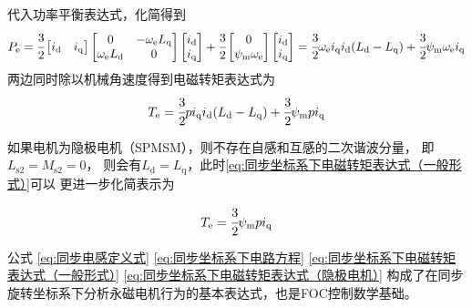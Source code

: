 代入功率平衡表达式，化简得到
\begin{equation*}
P_{\mathrm{e}}=\cfrac32\begin{bmatrix}i_{\mathrm{d}}&i_{\mathrm{q}}\end{bmatrix}
\begin{bmatrix}0&-\omega_{\mathrm{e}}L_{\mathrm{q}}\\\omega_{\mathrm{e}}L_{\mathrm{d}}&0\end{bmatrix}
\begin{bmatrix}i_{\mathrm{d}}\\i_{\mathrm{q}}\end{bmatrix}
+\cfrac32\begin{bmatrix}0\\\psi_{\mathrm{m}}\omega_{\mathrm{e}}\end{bmatrix}
\begin{bmatrix}i_{\mathrm{d}}\\i_{\mathrm{q}}\end{bmatrix}
=\cfrac32\omega_{\mathrm{e}}i_{\mathrm{q}}i_{\mathrm{d}}(L_{\mathrm{d}}-L_{\mathrm{q}})+\cfrac32\psi_{\mathrm{m}}\omega_{\mathrm{e}}i_{\mathrm{q}}
\end{equation*}
两边同时除以机械角速度得到电磁转矩表达式为
\begin{equation}
    T_{\mathrm{e}}=\cfrac32pi_{\mathrm{q}}i_{\mathrm{d}}(L_{\mathrm{d}}-L_{\mathrm{q}})+\cfrac32\psi_{\mathrm{m}}pi_{\mathrm{q}}
    \label{eq:同步坐标系下电磁转矩表达式（一般形式）}
\end{equation}

如果电机为隐极电机（SPMSM），则不存在自感和互感的二次谐波分量，
即\(L_{\mathrm{s}2}=M_{\mathrm{s}2}=0\)，
则会有\(L_{\mathrm{d}}=L_{\mathrm{q}}\)，此时\eqref{eq:同步坐标系下电磁转矩表达式（一般形式）}可以
更进一步化简表示为

\begin{equation}
   T_{\mathrm{e}}=\cfrac 32\psi_{\mathrm{m}}pi_{\mathrm{q}}
   \label{eq:同步坐标系下电磁转矩表达式（隐极电机）}
\end{equation}

公式
\eqref{eq:同步电感定义式}
\eqref{eq:同步坐标系下电路方程}
\eqref{eq:同步坐标系下电磁转矩表达式（一般形式）}
\eqref{eq:同步坐标系下电磁转矩表达式（隐极电机）}
构成了在同步旋转坐标系下分析永磁电机行为的基本表达式，也是FOC控制数学基础。